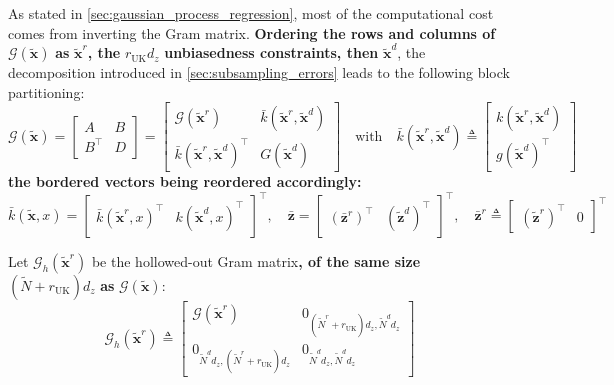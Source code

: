 \documentclass[preprint]{elsarticle}
\begin{document}
As stated in \cref{sec:gaussian_process_regression}, most of the computational cost comes from inverting the Gram matrix. \textbf{Ordering the rows and columns of} $\mathcal{G}(\tilde{\mathbf{x}})$ \textbf{as} $\tilde{\mathbf{x}}^r$\textbf{, the} $r_{\mathrm{UK}}d_z$ \textbf{unbiasedness constraints, then} $\tilde{\mathbf{x}}^d$, the decomposition introduced in \cref{sec:subsampling_errors} leads to the following block partitioning:
\begin{equation}
    \mathcal{G}(\tilde{\mathbf{x}})=\begin{bmatrix}A&B\\B^\top&D\end{bmatrix}=\begin{bmatrix}\mathcal{G}(\tilde{\mathbf{x}}^r)&\bar{k}(\tilde{\mathbf{x}}^r,\tilde{\mathbf{x}}^d)\\\bar{k}(\tilde{\mathbf{x}}^r,\tilde{\mathbf{x}}^d)^\top&G(\tilde{\mathbf{x}}^d)\end{bmatrix}\quad\text{with}\quad\bar{k}(\tilde{\mathbf{x}}^r,\tilde{\mathbf{x}}^d)\triangleq\begin{bmatrix}k(\tilde{\mathbf{x}}^r,\tilde{\mathbf{x}}^d)\\g(\tilde{\mathbf{x}}^d)^\top\end{bmatrix}
\end{equation}
\textbf{the bordered vectors being reordered accordingly:}
\begin{equation}
    \bar{k}(\tilde{\mathbf{x}},x)=\begin{bmatrix}\bar{k}(\tilde{\mathbf{x}}^r,x)^\top&k(\tilde{\mathbf{x}}^d,x)^\top\end{bmatrix}^\top,\quad\bar{\mathbf{z}}=\begin{bmatrix}\left(\bar{\mathbf{z}}^r\right)^\top&\left(\tilde{\mathbf{z}}^d\right)^\top\end{bmatrix}^\top,\quad\bar{\mathbf{z}}^r\triangleq\begin{bmatrix}\left(\tilde{\mathbf{z}}^r\right)^\top&0\end{bmatrix}^\top
\end{equation}

Let $\mathcal{G}_h(\tilde{\mathbf{x}}^r)$ be the hollowed-out Gram matrix\textbf{, of the same size} $(\tilde{N}+r_{\mathrm{UK}})d_z$ \textbf{as} $\mathcal{G}(\tilde{\mathbf{x}})$:
\begin{equation}
    \mathcal{G}_h(\tilde{\mathbf{x}}^r)\triangleq\begin{bmatrix}\mathcal{G}(\tilde{\mathbf{x}}^r)&0_{(\tilde{N}^r+r_{\mathrm{UK}})d_z,\tilde{N}^dd_z}\\0_{\tilde{N}^dd_z,(\tilde{N}^r+r_{\mathrm{UK}})d_z}&0_{\tilde{N}^dd_z,\tilde{N}^dd_z}\end{bmatrix}
\end{equation}
\end{document}
